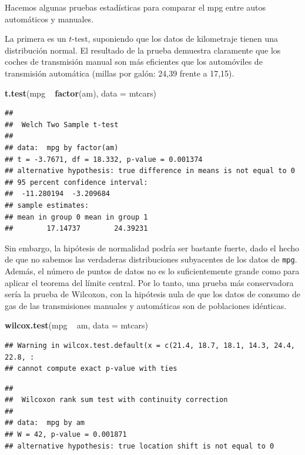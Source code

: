\documentclass[]{article}
\newenvironment{Shaded}{\begin{snugshade}}{\end{snugshade}}
\newcommand{\KeywordTok}[1]{\textcolor[rgb]{0.13,0.29,0.53}{\textbf{{#1}}}}
\newcommand{\DataTypeTok}[1]{\textcolor[rgb]{0.13,0.29,0.53}{{#1}}}
\newcommand{\StringTok}[1]{\textcolor[rgb]{0.31,0.60,0.02}{{#1}}}
\newcommand{\NormalTok}[1]{{#1}}
\numberwithin{equation}{section}
\begin{document}
Hacemos algunas pruebas estadísticas para comparar el mpg entre autos
automáticos y manuales.

La primera es un \(t\)-test, suponiendo que los datos de kilometraje
tienen una distribución normal. El resultado de la prueba demuestra
claramente que los coches de transmisión manual son más eficientes que
los automóviles de transmisión automática (millas por galón: 24,39
frente a 17,15).

\begin{Shaded}
\begin{Highlighting}[]
\KeywordTok{t.test}\NormalTok{(mpg ~}\StringTok{ }\KeywordTok{factor}\NormalTok{(am), }\DataTypeTok{data =} \NormalTok{mtcars)}
\end{Highlighting}
\end{Shaded}

\begin{verbatim}
## 
##  Welch Two Sample t-test
## 
## data:  mpg by factor(am)
## t = -3.7671, df = 18.332, p-value = 0.001374
## alternative hypothesis: true difference in means is not equal to 0
## 95 percent confidence interval:
##  -11.280194  -3.209684
## sample estimates:
## mean in group 0 mean in group 1 
##        17.14737        24.39231
\end{verbatim}

Sin embargo, la hipótesis de normalidad podría ser bastante fuerte, dado
el hecho de que no sabemos las verdaderas distribuciones subyacentes de
los datos de \texttt{mpg}. Además, el número de puntos de datos no es lo
suficientemente grande como para aplicar el teorema del límite central.
Por lo tanto, una prueba más conservadora sería la prueba de Wilcoxon,
con la hipótesis nula de que los datos de consumo de gas de las
transmisiones manuales y automáticas son de poblaciones idénticas.

\begin{Shaded}
\begin{Highlighting}[]
\KeywordTok{wilcox.test}\NormalTok{(mpg ~}\StringTok{ }\NormalTok{am, }\DataTypeTok{data =} \NormalTok{mtcars)}
\end{Highlighting}
\end{Shaded}

\begin{verbatim}
## Warning in wilcox.test.default(x = c(21.4, 18.7, 18.1, 14.3, 24.4, 22.8, :
## cannot compute exact p-value with ties
\end{verbatim}

\begin{verbatim}
## 
##  Wilcoxon rank sum test with continuity correction
## 
## data:  mpg by am
## W = 42, p-value = 0.001871
## alternative hypothesis: true location shift is not equal to 0
\end{verbatim}
\end{document}
